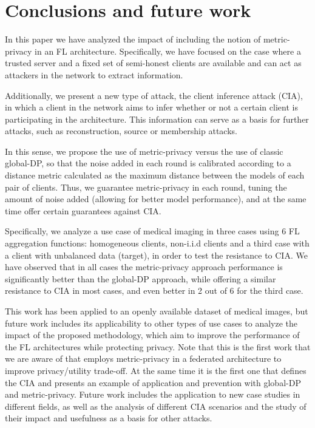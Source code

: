 \documentclass[5p,times]{elsarticle}
\begin{document}
\section{Conclusions and future work}\label{sec:conclusions}

In this paper we have analyzed the impact of including the notion of metric-privacy in an FL architecture. Specifically, we have focused on the case where a trusted server and a fixed set of semi-honest clients are available and can act as attackers in the network to extract information. 

Additionally, we present a new type of attack, the client inference attack (CIA), in which a client in the network aims to infer whether or not a certain client is participating in the architecture. This information can serve as a basis for further attacks, such as reconstruction, source or membership attacks.

In this sense, we propose the use of metric-privacy versus the use of classic global-DP, so that the noise added in each round is calibrated according to a distance metric calculated as the maximum distance between the models of each pair of clients. Thus, we guarantee metric-privacy in each round, tuning the amount of noise added (allowing for better model performance), and at the same time offer certain guarantees against CIA. 

Specifically, we analyze a use case of medical imaging in three cases using 6 FL aggregation functions: homogeneous clients, non-i.i.d clients and a third case with a client with unbalanced data (target), in order to test the resistance to CIA. We have observed that in all cases the metric-privacy approach performance is significantly better than the global-DP approach, while offering a similar resistance to CIA in most cases, and even better in 2 out of 6 for the third case. 

This work has been applied to an openly available dataset of medical images, but future work includes its applicability to other types of use cases to analyze the impact of the proposed methodology, which aim to improve the performance of the FL architectures while protecting privacy. Note that this is the first work that we are aware of that employs metric-privacy in a federated architecture to improve privacy/utility trade-off. At the same time it is the first one that defines the CIA and presents an example of application and prevention with global-DP and metric-privacy. Future work includes the application to new case studies in different fields, as well as the analysis of different CIA scenarios and the study of their impact and usefulness as a basis for other attacks.\\
\end{document}
